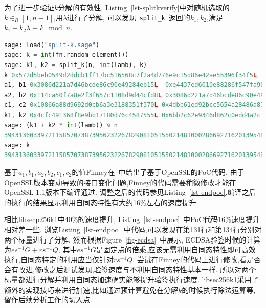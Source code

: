 \documentclass{article}
\newcommand{\code}[1]{\lstinline!#1!}
\begin{document}


为了进一步验证$k$分解的有效性, Listing~\ref{lst-splitkverify}中对随机选取的$k\in_R[1,n-1]$,用$\lambda$进行了分解,
可以发现~\code{split_k}~返回的$k_1, k_2$,满足$k_1 + k_2\lambda\equiv k\mod n$.
\begin{lstlisting}[language=python, caption=\texttt{verify multiplier split  with $\lambda$ for secp256k1}, label=lst-splitkverify]
sage: load("split-k.sage")
sage: k = int(fn.random_element())
sage: k1, k2 = split_k(n, int(lamb), k)
k 0x572d5beb0549d2ddcb1ff17bc516568c7f2a4d776e9c15d86e42ae55396f34f5L
a1, b1 0x3086d221a7d46bcde86c90e49284eb15L -0xe4437ed6010e88286f547fa90abfe4c3L
a2, b2 0x114ca50f7a8e2f3f657c1108d9d44cfd8L 0x3086d221a7d46bcde86c90e49284eb15L
c1, c2 0x10866a88d9692d0cb6a3e3188351f370L 0x4dbb61ed92bcc5654a28486a8793676aL
k1, k2 0x4cfc491368f8e9bb17180d76c4587555L 0x6bb2c62e9346d862c0edd4a2cf1e649eL
sage: (k1 + k2 * int(lamb)) % n
39431360339721158570738739562322678290810515502148100028669271620139548095733
sage: k
39431360339721158570738739562322678290810515502148100028669271620139548095733L
\end{lstlisting}

基于$a_1, b_1, a_2, b_2, c_1, c_2$的值Finney在~\cite{halfinney}中给出了基于OpenSSL的PoC代码.
由于OpenSSL版本变动导致的接口变化问题,Finney的代码需要稍微修改才能在OpenSSL 1.1版本下编译通过.
调整之后的代码参见Listing~\ref{lst-endpoc},编译之后的执行的结果显示利用自同态特性有大约16\%左右的速度提升.



相比libsecp256k1中40\%的速度提升, Listing~\ref{lst-endpoc}~中PoC代码16\%速度提升相对差一些.
浏览Listing~\ref{lst-endpoc}~中代码,可以发现在第131行和第134行分别对两个标量进行了分解.
然而根据Figure~\ref{fig-ecdsa}~中展示, ECDSA验签时候的计算为$es^{-1}G + rs^{-1}Q$,
其中$es^{-1}G$是固定点的倍乘,应该无需利用自同态特性即可高效执行,自同态特定的利用应当仅针对$rs^{-1}Q$.
尝试在Finney的代码上进行修改,看是否会有改进,修改之后测试发现,验签速度与不利用自同态特性基本一样.
所以对两个标量都进行分解并利用自同态加速确实能够提升验签执行速度.
libsec256k1采用了额外的实现技巧来进行加速,比如通过预计算避免在分解$k$的时候执行除法运算等,留作后续分析工作的切入点.
\end{document}
